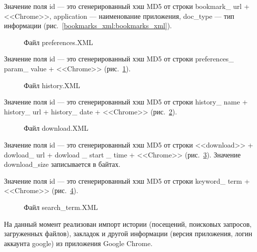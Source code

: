 Значение поля id --- это сгенерированный хэш MD5 от строки bookmark\_ url + <<Chrome>>, application --- наименование приложения, doc\_type --- тип информации (рис.~\ref{bookmarks_xml:bookmarks_xml}).

\begin{figure}[ht]                                          %
\caption{Файл preferences.XML}
\label{preferences_xml:preferences_xml}
\end{figure}

Значение поля id --- это сгенерированный хэш MD5 от строки preferences\_ param\_ value + <<Chrome>> (рис.~\ref{preferences_xml:preferences_xml}).

\begin{figure}[ht]                                           %
\caption{Файл history.XML}
\label{history_xml:history_xml}
\end{figure}

Значение поля id --- это сгенерированный хэш MD5 от строки history\_ name + history\_ url + history\_ date + <<Chrome>> (рис.~\ref{history_xml:history_xml}).

\begin{figure}[ht]                                            %
\caption{Файл download.XML}
\label{download_xml:download_xml}
\end{figure}

Значение поля id --- это сгенерированный хэш MD5 от строки <<download>> + dowload\_ url + dowload \_ start \_ time + <<Chrome>> (рис.~\ref{download_xml:download_xml}). Значение download\_size записывается в байтах.


Значение поля id --- это сгенерированный хэш MD5 от строки keyword\_ term + <<Chrome>> (рис.~\ref{search_term_xml:search_term_xml}).

\begin{figure}[!pHt]                                          %
\caption{Файл search\_term.XML}
\label{search_term_xml:search_term_xml}
\end{figure}

На данный момент реализован импорт истории (посещений, поисковых запросов, загруженных файлов), закладок и 
другой информации (версия приложения, логин аккаунта google) из приложения Google Chrome.

